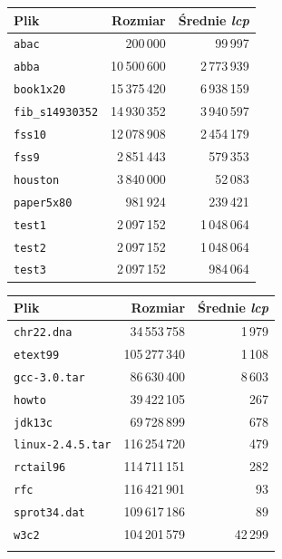 \begin{table}[ht]
    \begin{center} \small
    \begin{tabular}{l r r}
    \toprule
    Plik                    & Rozmiar           & Średnie \emph{lcp} \\ \midrule
    \texttt{abac}           &          200\,000 &         99\,997 \\         
    \texttt{abba}           &      10\,500\,600 &     2\,773\,939 \\         
    \texttt{book1x20}       &      15\,375\,420 &     6\,938\,159 \\         
    \texttt{fib\_s14930352} &      14\,930\,352 &     3\,940\,597 \\         
    \texttt{fss10}          &      12\,078\,908 &     2\,454\,179 \\         
    \texttt{fss9}           &       2\,851\,443 &        579\,353 \\         
    \texttt{houston}        &       3\,840\,000 &         52\,083 \\         
    \texttt{paper5x80}      &          981\,924 &        239\,421 \\         
    \texttt{test1}          &       2\,097\,152 &     1\,048\,064 \\         
    \texttt{test2}          &       2\,097\,152 &     1\,048\,064 \\         
    \texttt{test3}          &       2\,097\,152 &        984\,064 \\         
    \bottomrule
    \end{tabular}
    \hspace{1cm}
    \begin{tabular}{l r r}
    \toprule
    Plik                     & Rozmiar           & Średnie \emph{lcp} \\ \midrule
    \texttt{chr22.dna}       &      34\,553\,758 &          1\,979 \\         
    \texttt{etext99}         &     105\,277\,340 &          1\,108 \\         
    \texttt{gcc-3.0.tar}     &      86\,630\,400 &          8\,603 \\         
    \texttt{howto}           &      39\,422\,105 &             267 \\         
    \texttt{jdk13c}          &      69\,728\,899 &             678 \\         
    \texttt{linux-2.4.5.tar} &     116\,254\,720 &             479 \\         
    \texttt{rctail96}        &     114\,711\,151 &             282 \\         
    \texttt{rfc}             &     116\,421\,901 &              93 \\         
    \texttt{sprot34.dat}     &     109\,617\,186 &              89 \\         
    \texttt{w3c2}            &     104\,201\,579 &         42\,299 \\
    \bottomrule
    \\
    \end{tabular}
    

\end{center}
\end{table}
